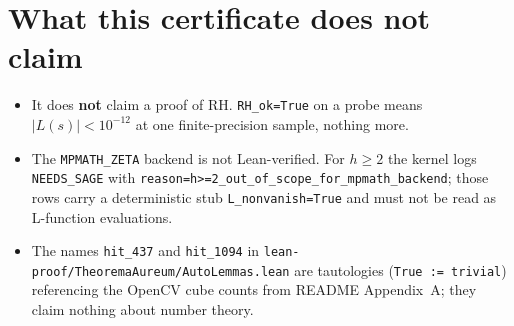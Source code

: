 \documentclass[11pt]{article}
\begin{document}
\section*{What this certificate does \textbf{not} claim}
\begin{itemize}
  \item It does \textbf{not} claim a proof of RH. \texttt{RH\_ok=True}
        on a probe means $|L(s)| < 10^{-12}$ at one
        finite-precision sample, nothing more.
  \item The \texttt{MPMATH\_ZETA} backend is not Lean-verified. For
        $h\!\ge\!2$ the kernel logs \texttt{NEEDS\_SAGE} with
        \texttt{reason=h>=2\_out\_of\_scope\_for\_mpmath\_backend};
        those rows carry a deterministic stub
        \texttt{L\_nonvanish=True} and must not be read as
        L-function evaluations.
  \item The names \texttt{hit\_437} and \texttt{hit\_1094} in
        \texttt{lean-proof/TheoremaAureum/AutoLemmas.lean} are
        tautologies (\texttt{True := trivial}) referencing the
        OpenCV cube counts from README Appendix~A; they claim
        nothing about number theory.
\end{itemize}
\end{document}
